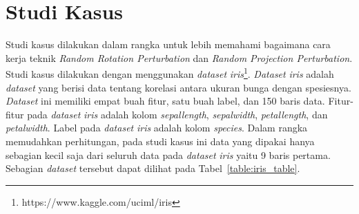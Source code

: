 \section{Studi Kasus}
\label{sec:studi-kasus}

Studi kasus dilakukan dalam rangka untuk lebih memahami bagaimana cara kerja teknik \textit{Random Rotation Perturbation} dan \textit{Random Projection Perturbation}. Studi kasus dilakukan dengan menggunakan \textit{dataset} \textit{iris}\footnote{https://www.kaggle.com/uciml/iris}. \textit{Dataset} \textit{iris} adalah \textit{dataset} yang berisi data tentang korelasi antara ukuran bunga dengan spesiesnya. \textit{Dataset} ini memiliki empat buah fitur, satu buah label, dan 150 baris data. Fitur-fitur pada \textit{dataset} \textit{iris} adalah kolom \textit{sepal\textunderscore length}, \textit{sepal\textunderscore width}, \textit{petal\textunderscore length}, dan \textit{petal\textunderscore width}. Label pada \textit{dataset} \textit{iris} adalah kolom \textit{species}. Dalam rangka memudahkan perhitungan, pada studi kasus ini data yang dipakai hanya sebagian kecil saja dari seluruh data pada \textit{dataset} \textit{iris} yaitu 9 baris pertama. Sebagian \textit{dataset} tersebut dapat dilihat pada Tabel~\ref{table:iris_table}.

